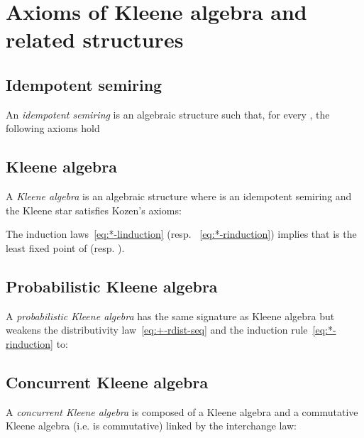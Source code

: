 \documentclass[review]{elsart}
\newenvironment{append}{}{}
\begin{document}


\begin{append}
\newpage
\appendix
\section{Axioms of Kleene algebra and related structures}\label{A:ka}
\subsection{Idempotent semiring}
An \emph{idempotent semiring} is an algebraic structure  such that, for every , the following axioms hold

\subsection{Kleene algebra}
A \emph{Kleene algebra} is an algebraic structure  where  is an idempotent semiring and the Kleene star  satisfies Kozen's axioms:

The induction laws~\ref{eq:*-linduction} (resp. ~\ref{eq:*-rinduction}) implies that  is the least fixed point of  (resp. ).
\subsection{Probabilistic Kleene algebra}
A \emph{probabilistic Kleene algebra} has the same signature as Kleene algebra but weakens the distributivity law~\ref{eq:+-rdist-seq} and the induction rule~\ref{eq:*-rinduction} to:

\subsection{Concurrent Kleene algebra}
A \emph{concurrent Kleene algebra} is composed of a Kleene algebra  and a commutative Kleene algebra  (i.e.  is commutative) linked by the interchange law:

\end{append}
\end{document}
